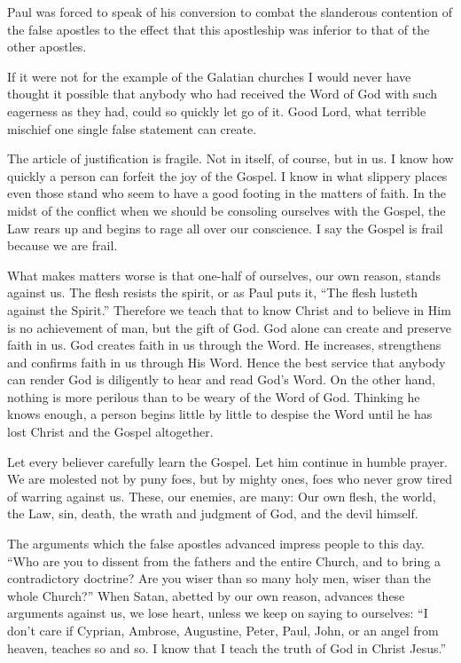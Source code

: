 Paul was forced to speak of his conversion to combat the slanderous contention of the false apostles to the effect that this apostleship was inferior to that of the other apostles.

If it were not for the example of the Galatian churches I would never have thought it possible that anybody who had received the Word of God with such eagerness as they had, could so quickly let go of it. Good Lord, what terrible mischief one single false statement can create.

The article of justification is fragile. Not in itself, of course, but in us. I know how quickly a person can forfeit the joy of the Gospel. I know in what slippery places even those stand who seem to have a good footing in the matters of faith. In the midst of the conflict when we should be consoling ourselves with the Gospel, the Law rears up and begins to rage all over our conscience. I say the Gospel is frail because we are frail.

What makes matters worse is that one-half of ourselves, our own reason, stands against us. The flesh resists the spirit, or as Paul puts it, “The flesh lusteth against the Spirit.” Therefore we teach that to know Christ and to believe in Him is no achievement of man, but the gift of God. God alone can create and preserve faith in us. God creates faith in us through the Word. He increases, strengthens and confirms faith in us through His Word. Hence the best service that anybody can render God is diligently to hear and read God’s Word. On the other hand, nothing is more perilous than to be weary of the Word of God. Thinking he knows enough, a person begins little by little to despise the Word until he has lost Christ and the Gospel altogether.

Let every believer carefully learn the Gospel. Let him continue in humble prayer. We are molested not by puny foes, but by mighty ones, foes who never grow tired of warring against us. These, our enemies, are many: Our own flesh, the world, the Law, sin, death, the wrath and judgment of God, and the devil himself.

The arguments which the false apostles advanced impress people to this day. “Who are you to dissent from the fathers and the entire Church, and to bring a contradictory doctrine? Are you wiser than so many holy men, wiser than the whole Church?” When Satan, abetted by our own reason, advances these arguments against us, we lose heart, unless we keep on saying to ourselves: “I don’t care if Cyprian, Ambrose, Augustine, Peter, Paul, John, or an angel from heaven, teaches so and so. I know that I teach the truth of God in Christ Jesus.”

